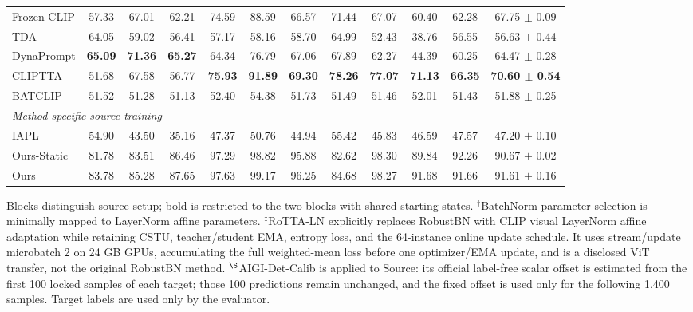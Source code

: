 \begin{table}[t]
{\begin{tabular}{lccccccccccc}
Frozen CLIP & 57.33 & 67.01 & 62.21 & 74.59 & 88.59 & 66.57 & 71.44 & 67.07 & 60.40 & 62.28 & 67.75 $\pm$ 0.09 \\
TDA & 64.05 & 59.02 & 56.41 & 57.17 & 58.16 & 58.70 & 64.99 & 52.43 & 38.76 & 56.55 & 56.63 $\pm$ 0.44 \\
DynaPrompt & \textbf{65.09} & \textbf{71.36} & \textbf{65.27} & 64.34 & 76.79 & 67.06 & 67.89 & 62.27 & 44.39 & 60.25 & 64.47 $\pm$ 0.28 \\
CLIPTTA & 51.68 & 67.58 & 56.77 & \textbf{75.93} & \textbf{91.89} & \textbf{69.30} & \textbf{78.26} & \textbf{77.07} & \textbf{71.13} & \textbf{66.35} & \textbf{70.60 $\pm$ 0.54} \\
BATCLIP & 51.52 & 51.28 & 51.13 & 52.40 & 54.38 & 51.73 & 51.49 & 51.46 & 52.01 & 51.43 & 51.88 $\pm$ 0.25 \\
\midrule
\multicolumn{12}{l}{\textit{Method-specific source training}} \\
IAPL & 54.90 & 43.50 & 35.16 & 47.37 & 50.76 & 44.94 & 55.42 & 45.83 & 46.59 & 47.57 & 47.20 $\pm$ 0.10 \\
Ours-Static & 81.78 & 83.51 & 86.46 & 97.29 & 98.82 & 95.88 & 82.62 & 98.30 & 89.84 & 92.26 & 90.67 $\pm$ 0.02 \\
Ours & 83.78 & 85.28 & 87.65 & 97.63 & 99.17 & 96.25 & 84.68 & 98.27 & 91.68 & 91.66 & 91.61 $\pm$ 0.16 \\
\bottomrule
\end{tabular}%
}
\vspace{2pt}
\parbox{\textwidth}{\footnotesize Blocks distinguish source setup; bold is restricted to the two blocks with shared starting states. $^{\dagger}$BatchNorm parameter selection is minimally mapped to LayerNorm affine parameters. $^{\ddagger}$RoTTA-LN explicitly replaces RobustBN with CLIP visual LayerNorm affine adaptation while retaining CSTU, teacher/student EMA, entropy loss, and the 64-instance online update schedule. It uses stream/update microbatch 2 on 24 GB GPUs, accumulating the full weighted-mean loss before one optimizer/EMA update, and is a disclosed ViT transfer, not the original RobustBN method. $^{\S}$AIGI-Det-Calib is applied to Source: its official label-free scalar offset is estimated from the first 100 locked samples of each target; those 100 predictions remain unchanged, and the fixed offset is used only for the following 1,400 samples. Target labels are used only by the evaluator.}
\end{table}
